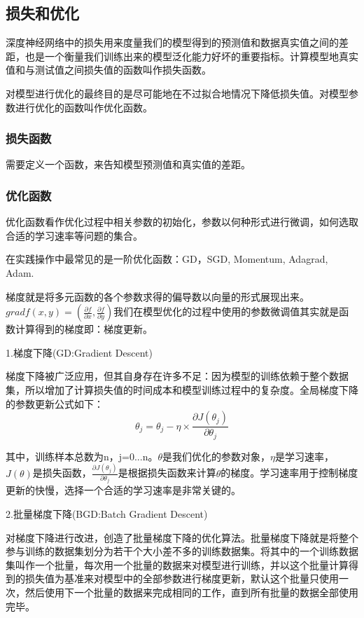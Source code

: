 \documentclass[openbib]{article}
\begin{document}
\subsection{损失和优化}
深度神经网络中的损失用来度量我们的模型得到的预测值和数据真实值之间的差距，也是一个衡量我们训练出来的模型泛化能力好坏的重要指标。计算模型地真实值和与测试值之间损失值的函数叫作损失函数。

对模型进行优化的最终目的是尽可能地在不过拟合地情况下降低损失值。对模型参数进行优化的函数叫作优化函数。

\subsubsection{损失函数}
需要定义一个函数，来告知模型预测值和真实值的差距。

\subsubsection{优化函数}
优化函数看作优化过程中相关参数的初始化，参数以何种形式进行微调，如何选取合适的学习速率等问题的集合。

在实践操作中最常见的是一阶优化函数：GD，SGD, Momentum, Adagrad, Adam.

梯度就是将多元函数的各个参数求得的偏导数以向量的形式展现出来。$gradf(x,y)=(\frac{\partial f}{\partial x},\frac{\partial f}{\partial y})$我们在模型优化的过程中使用的参数微调值其实就是函数计算得到的梯度即：梯度更新。

\begin{center}
	1.梯度下降(GD:Gradient Descent)
\end{center}

梯度下降被广泛应用，但其自身存在许多不足：因为模型的训练依赖于整个数据集，所以增加了计算损失值的时间成本和模型训练过程中的复杂度。全局梯度下降的参数更新公式如下：
$$\theta_j=\theta_j-\eta\times\frac{\partial J(\theta_j)}{\partial \theta_j}$$

其中，训练样本总数为n，j=0...n。$\theta$是我们优化的参数对象，$\eta$是学习速率，$J(\theta)$是损失函数，$\frac{\partial J(\theta_j)}{\partial \theta_j}$是根据损失函数来计算$\theta$的梯度。学习速率用于控制梯度更新的快慢，选择一个合适的学习速率是非常关键的。

\begin{center}
	2.批量梯度下降(BGD:Batch Gradient Descent)
\end{center}

对梯度下降进行改进，创造了批量梯度下降的优化算法。批量梯度下降就是将整个参与训练的数据集划分为若干个大小差不多的训练数据集。将其中的一个训练数据集叫作一个批量，每次用一个批量的数据来对模型进行训练，并以这个批量计算得到的损失值为基准来对模型中的全部参数进行梯度更新，默认这个批量只使用一次，然后使用下一个批量的数据来完成相同的工作，直到所有批量的数据全部使用完毕。
\end{document}
